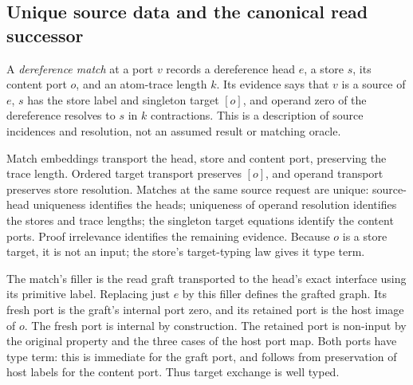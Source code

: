\subsection{Unique source data and the canonical read successor}

A \emph{dereference match} at a port $v$ records a dereference head $e$, a
store $s$, its content port $o$, and an atom-trace length $k$. Its evidence
says that $v$ is a source of $e$, $s$ has the store label and singleton target
$[o]$, and operand zero of the dereference resolves to $s$ in $k$ contractions.
This is a description of source incidences and resolution, not an assumed
result or matching oracle.


Match embeddings transport the head, store and content port, preserving
the trace length. Ordered target transport preserves $[o]$, and operand
transport preserves store resolution. Matches at the same source request
are unique: source-head uniqueness identifies the heads; uniqueness of
operand resolution identifies the stores and trace lengths; the singleton
target equations identify the content ports. Proof irrelevance identifies
the remaining evidence. Because $o$ is a store target, it is not an input;
the store's target-typing law gives it type term.





The match's filler is the read graft transported to the head's exact
interface using its primitive label. Replacing just $e$ by this filler
defines the grafted graph. Its fresh port is the graft's internal port zero,
and its retained port is the host image of $o$. The fresh port is internal
by construction. The retained port is non-input by the original property
and the three cases of the host port map. Both ports have type term: this
is immediate for the graft port, and follows from preservation of host
labels for the content port. Thus target exchange is well typed.


